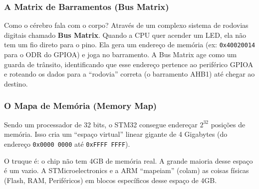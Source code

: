 \documentclass[12pt,a4paper]{article}
\begin{document}
\subsubsection*{A Matrix de Barramentos (Bus Matrix)}
Como o cérebro fala com o corpo? Através de um complexo sistema de rodovias digitais chamado \textbf{Bus Matrix}.
Quando a CPU quer acender um LED, ela não tem um fio direto para o pino. Ela gera um endereço de memória (ex: \texttt{0x40020014} para o ODR do GPIOA) e joga no barramento. A Bus Matrix age como um guarda de trânsito, identificando que esse endereço pertence ao periférico GPIOA e roteando os dados para a ``rodovia'' correta (o barramento AHB1) até chegar ao destino.

\subsubsection*{O Mapa de Memória (Memory Map)}
Sendo um processador de 32 bits, o STM32 consegue endereçar $2^{32}$ posições de memória. Isso cria um ``espaço virtual'' linear gigante de 4 Gigabytes (do endereço \texttt{0x0000 0000} até \texttt{0xFFFF FFFF}).



O truque é: o chip não tem 4GB de memória real. A grande maioria desse espaço é um vazio. A STMicroelectronics e a ARM ``mapeiam'' (colam) as coisas físicas (Flash, RAM, Periféricos) em blocos específicos desse espaço de 4GB.
\end{document}
